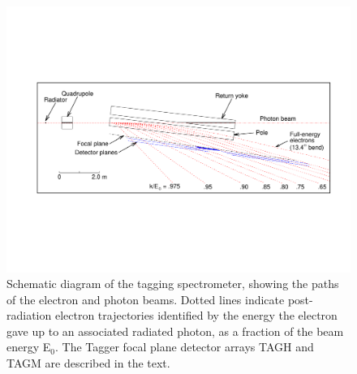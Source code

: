 \begin{figure}[tbp]
\begin{center}
   \includegraphics[width=0.95\linewidth,viewport=80 200 750 400]{figures/BEAM_taggerplot.pdf}
\caption{Schematic diagram of the tagging spectrometer, showing the paths of the electron
and photon beams. Dotted lines indicate post-radiation electron trajectories identified by
the energy the electron gave up to an associated radiated photon, as a fraction of the beam energy E$_0$.
The Tagger focal plane detector arrays TAGH and TAGM are described in the text.
       \label{fig:beam:BEAM_taggerplot}  }
\end{center}
\end{figure}

